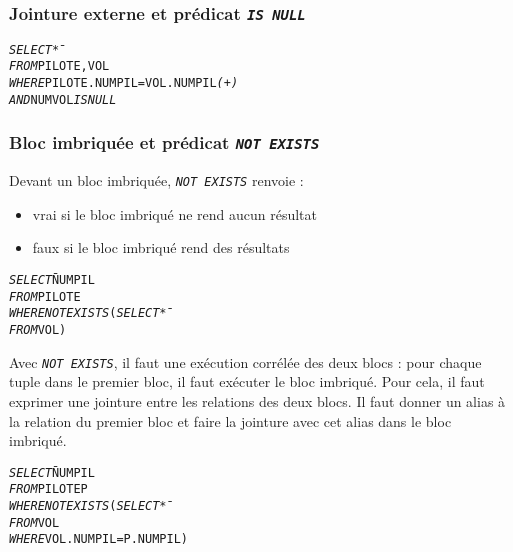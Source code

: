 \documentclass[10pt]{article}
\begin{document}
			\subsubsection{Jointure externe et prédicat \emph{\texttt{IS NULL}}}
				\begin{alltt}
					\begin{tabbing}
						\emph{SELECT} \= *\\
						\emph{FROM}	\> PILOTE,VOL \\
						\emph{WHERE} \> PILOTE.NUMPIL=VOL.NUMPIL\emph{(+)}\\
									\> \emph{AND} NUMVOL \emph{IS NULL}
					\end{tabbing}
				\end{alltt}
				
			\subsubsection{Bloc imbriquée et prédicat \emph{\texttt{NOT EXISTS}}}\index{EXISTS}
				Devant un bloc imbriquée, \emph{\texttt{NOT EXISTS}} renvoie :
					\begin{itemize}
						\item vrai si le bloc imbriqué ne rend aucun résultat
						\item faux si le bloc imbriqué rend des résultats
					\end{itemize}
					
				\begin{alltt}
					\begin{tabbing}
						\emph{SELECT} \= NUMPIL\\
						\emph{FROM}	\> PILOTE\\
						\emph{WHERE} \> \emph{NOT EXISTS} (\=\emph{SELECT}\= *\\
														\>\>\emph{FROM}\> VOL)
					\end{tabbing}
				\end{alltt}
				
				Avec \emph{\texttt{NOT EXISTS}}, il faut une exécution corrélée des deux blocs : pour chaque tuple dans le premier bloc, il faut exécuter le bloc imbriqué. Pour cela, il faut exprimer une jointure entre les relations des deux blocs. Il faut donner un alias à la relation du premier bloc et faire la jointure avec cet alias dans le bloc imbriqué.
				
				\begin{alltt}
					\begin{tabbing}
						\emph{SELECT} \= NUMPIL\\
						\emph{FROM}	\> PILOTE P\\
						\emph{WHERE} \> \emph{NOT EXISTS} (\=\emph{SELECT}\= *\\
														\>\>\emph{FROM}\> VOL\\
														\>\>\emph{WHERE}\> VOL.NUMPIL=P.NUMPIL)
					\end{tabbing}
				\end{alltt}
				
\end{document}
